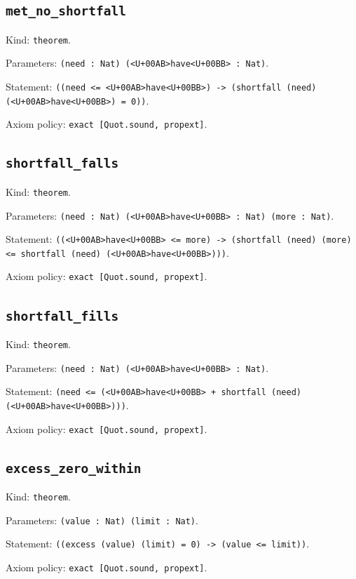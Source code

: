 \documentclass[11pt]{article}
\begin{document}
\subsection*{\texttt{met\_no\_shortfall}}
\noindent Kind: \texttt{theorem}.\par
\noindent Parameters: \texttt{(need : Nat) (<U+00AB>have<U+00BB> : Nat)}.\par
\noindent Statement: \texttt{((need <= <U+00AB>have<U+00BB>) -> (shortfall (need) (<U+00AB>have<U+00BB>) = 0))}.\par
\noindent Axiom policy: \texttt{exact [Quot.sound, propext]}.\par
\subsection*{\texttt{shortfall\_falls}}
\noindent Kind: \texttt{theorem}.\par
\noindent Parameters: \texttt{(need : Nat) (<U+00AB>have<U+00BB> : Nat) (more : Nat)}.\par
\noindent Statement: \texttt{((<U+00AB>have<U+00BB> <= more) -> (shortfall (need) (more) <= shortfall (need) (<U+00AB>have<U+00BB>)))}.\par
\noindent Axiom policy: \texttt{exact [Quot.sound, propext]}.\par
\subsection*{\texttt{shortfall\_fills}}
\noindent Kind: \texttt{theorem}.\par
\noindent Parameters: \texttt{(need : Nat) (<U+00AB>have<U+00BB> : Nat)}.\par
\noindent Statement: \texttt{(need <= (<U+00AB>have<U+00BB> + shortfall (need) (<U+00AB>have<U+00BB>)))}.\par
\noindent Axiom policy: \texttt{exact [Quot.sound, propext]}.\par
\subsection*{\texttt{excess\_zero\_within}}
\noindent Kind: \texttt{theorem}.\par
\noindent Parameters: \texttt{(value : Nat) (limit : Nat)}.\par
\noindent Statement: \texttt{((excess (value) (limit) = 0) -> (value <= limit))}.\par
\noindent Axiom policy: \texttt{exact [Quot.sound, propext]}.\par
\end{document}
